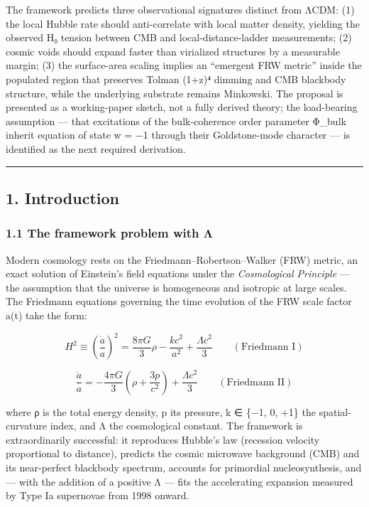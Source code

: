 \documentclass[
]{article}
\begin{document}
The framework predicts three observational signatures distinct from
ΛCDM: (1) the local Hubble rate should anti-correlate with local matter
density, yielding the observed H₀ tension between CMB and
local-distance-ladder measurements; (2) cosmic voids should expand
faster than virialized structures by a measurable margin; (3) the
surface-area scaling implies an ``emergent FRW metric'' inside the
populated region that preserves Tolman (1+z)⁴ dimming and CMB blackbody
structure, while the underlying substrate remains Minkowski. The
proposal is presented as a working-paper sketch, not a fully derived
theory; the load-bearing assumption --- that excitations of the
bulk-coherence order parameter Φ\_bulk inherit equation of state w = −1
through their Goldstone-mode character --- is identified as the next
required derivation.

\begin{center}\rule{0.5\linewidth}{0.5pt}\end{center}

\subsection{1. Introduction}\label{introduction}

\subsubsection{1.1 The framework problem with
Λ}\label{the-framework-problem-with-ux3bb}

Modern cosmology rests on the Friedmann--Robertson--Walker (FRW) metric,
an exact solution of Einstein's field equations under the
\emph{Cosmological Principle} --- the assumption that the universe is
homogeneous and isotropic at large scales. The Friedmann equations
governing the time evolution of the FRW scale factor a(t) take the form:

\[H^2 \equiv \left(\frac{\dot a}{a}\right)^2 = \frac{8 \pi G}{3} \rho - \frac{k c^2}{a^2} + \frac{\Lambda c^2}{3} \qquad (\text{Friedmann I})\]

\[\frac{\ddot a}{a} = -\frac{4 \pi G}{3}\left(\rho + \frac{3 p}{c^2}\right) + \frac{\Lambda c^2}{3} \qquad (\text{Friedmann II})\]

where ρ is the total energy density, p its pressure, k ∈ \{−1, 0, +1\}
the spatial-curvature index, and Λ the cosmological constant. The
framework is extraordinarily successful: it reproduces Hubble's law
(recession velocity proportional to distance), predicts the cosmic
microwave background (CMB) and its near-perfect blackbody spectrum,
accounts for primordial nucleosynthesis, and --- with the addition of a
positive Λ --- fits the accelerating expansion measured by Type Ia
supernovae from 1998 onward.
\end{document}
